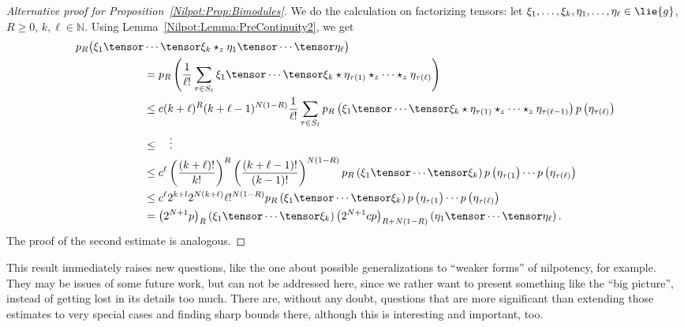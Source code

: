 \begin{proof}[Alternative proof for Proposition~\ref{Nilpot:Prop:Bimodules}]
	We do the calculation on factorizing tensors: let 
	$\xi_1, \ldots, \xi_k, \eta_1, \ldots, \eta_\ell \in \lie{g}$, $R \geq 0$, $k, 
	\ell \in \mathbb{N}$. Using Lemma~\ref{Nilpot:Lemma:PreContinuity2}, we get
	\begin{align*}
		p_R \big(
			\xi_1 \tensor
		&			
			\cdots \tensor \xi_k
			\star_z
			\eta_1 \tensor \cdots \tensor \eta_\ell
		\big)
		\\
		&=
		p_R \left(
			\frac{1}{\ell!}
			\sum\limits_{\tau \in S_\ell}
			\xi_1 \tensor \cdots \tensor \xi_k
			\star
			\eta_{\tau(1)} \star_z \cdots \star_z \eta_{\tau(\ell)}
		\right)
		\\
		& \leq
		c (k + \ell)^R
		(k + \ell - 1)^{N (1-R)}
		\frac{1}{\ell!}
		\sum\limits_{\tau \in S_\ell}
		p_R \left(
			\xi_1 \tensor \cdots \tensor \xi_k
			\star
			\eta_{\tau(1)} \star_z \cdots \star_z \eta_{\tau(\ell-1)}
		\right)
		p\left( \eta_{\tau(\ell)} \right)
		\\
		& \leq
		\quad \vdots
		\\
		& \leq
		c^{\ell}
		\left(
			\frac{(k + \ell)!}{k!}
		\right)^R
		\left(
			\frac{(k + \ell - 1)!}{(k - 1)!}
		\right)^{N (1-R)}
		p_R \left(
			\xi_1 \tensor \cdots \tensor \xi_k
		\right)
		p\left( \eta_{\tau(1} \right)
		\cdots
		p\left( \eta_{\tau(\ell)} \right)
		\\
		& \leq
		c^{\ell}
		2^{k + l} 2^{N (k + \ell)}
		\ell!^{N (1-R)}
		p_R \left(
			\xi_1 \tensor \cdots \tensor \xi_k
		\right)
		p\left( \eta_{\tau(1} \right)
		\cdots
		p\left( \eta_{\tau(\ell)} \right)
		\\
		& =
		\left(2^{N + 1} p\right)_R 
		\left(
			\xi_1 \tensor \cdots \tensor \xi_k
		\right)
		\left(2^{N + 1} c p\right)_{R + N(1-R)}
		\left(
			\eta_1 \tensor \cdots \tensor \eta_\ell
		\right).
	\end{align*}
	The proof of the second estimate is analogous.
\end{proof}
\begin{remark}
	This result immediately raises new questions, like the one about possible 
	generalizations to ``weaker forms'' of nilpotency, for example. They may be 
	issues of some future work, but can not
	be addressed here, since we rather want to present something like  
	the ``big picture'', instead of getting 
	lost in its details too much. There are, without any doubt, questions that 
	are more significant than extending those estimates to very special cases 
	and finding sharp bounds there, although this is interesting and 
	important, too.
\end{remark}

